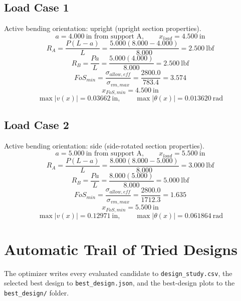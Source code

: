 \documentclass[11pt]{article}
\begin{document}
\subsection*{Load Case 1}
Active bending orientation: upright (upright section properties).
\[a = 4.000\ \mathrm{in} \text{ from support A}, \qquad x_{load} = 4.500\ \mathrm{in}\]
\[R_A = \frac{P(L-a)}{L} = \frac{5.000(8.000-4.000)}{8.000} = 2.500\ \mathrm{lbf}\]
\[R_B = \frac{Pa}{L} = \frac{5.000(4.000)}{8.000} = 2.500\ \mathrm{lbf}\]
\[FoS_{min} = \frac{\sigma_{allow,eff}}{\sigma_{vm,max}} = \frac{2800.0}{783.4} = 3.574\]
\[x_{FoS,min} = 4.500\ \mathrm{in}\]
\[\max |v(x)| = 0.03662\ \mathrm{in}, \qquad \max |\theta(x)| = 0.013620\ \mathrm{rad}\]
\subsection*{Load Case 2}
Active bending orientation: side (side-rotated section properties).
\[a = 5.000\ \mathrm{in} \text{ from support A}, \qquad x_{load} = 5.500\ \mathrm{in}\]
\[R_A = \frac{P(L-a)}{L} = \frac{8.000(8.000-5.000)}{8.000} = 3.000\ \mathrm{lbf}\]
\[R_B = \frac{Pa}{L} = \frac{8.000(5.000)}{8.000} = 5.000\ \mathrm{lbf}\]
\[FoS_{min} = \frac{\sigma_{allow,eff}}{\sigma_{vm,max}} = \frac{2800.0}{1712.3} = 1.635\]
\[x_{FoS,min} = 5.500\ \mathrm{in}\]
\[\max |v(x)| = 0.12971\ \mathrm{in}, \qquad \max |\theta(x)| = 0.061864\ \mathrm{rad}\]

\section*{Automatic Trail of Tried Designs}
The optimizer writes every evaluated candidate to \texttt{design\_study.csv}, the selected best design to \texttt{best\_design.json}, and the best-design plots to the \texttt{best\_design/} folder.
\end{document}
